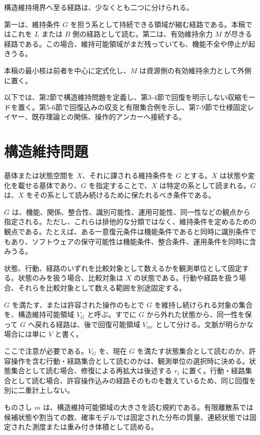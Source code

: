 \documentclass[12pt,a4paper]{article}
\begin{document}
構造維持境界へ至る経路は、少なくとも二つに分けられる。

第一は、維持条件 \(G\) を担う系として持続できる領域が縮む経路である。本稿ではこれを \(L\) または \(B\) 側の経路として読む。第二は、有効維持余力 \(M\) が尽きる経路である。この場合、維持可能領域がまだ残っていても、機能不全や停止が起きうる。

本稿の最小核は前者を中心に定式化し、\(M\) は資源側の有効維持余力として外側に置く。

以下では、第2節で構造維持問題を定義し、第3-4節で回復を明示しない収縮モードを置く。第5-6節で回復込みの収支と有限集合例を示し、第7-9節で仕様固定レイヤー、既存理論との関係、操作的アンカーへ接続する。

\section{構造維持問題}\label{ux69cbux9020ux7dadux6301ux554fux984c}

基体または状態空間を \(X\)、それに課される維持条件を \(G\) とする。\(X\) は状態や変化を載せる基体であり、\(G\) を指定することで、\(X\) は特定の系として読まれる。\(G\) は、\(X\) をその系として読み続けるために保たれるべき条件である。

\(G\) は、機能、関係、整合性、識別可能性、運用可能性、同一性などの観点から指定される。ただし、これらは排他的な分類ではなく、維持条件を定めるための観点である。たとえば、ある一意復元条件は機能条件であると同時に識別条件でもあり、ソフトウェアの保守可能性は機能条件、整合条件、運用条件を同時に含みうる。

状態、行動、経路のいずれを比較対象として数えるかを観測単位として固定する。状態のみを扱う場合、比較対象は \(X\) の状態である。行動や経路を扱う場合、それらを比較対象として数える範囲を別途固定する。

\(G\) を満たす、または許容された操作のもとで \(G\) を維持し続けられる対象の集合を、構造維持可能領域 \(V_{G}\) と呼ぶ。すでに \(G\) から外れた状態から、同一性を保って \(G\) へ戻れる経路は、後で回復可能領域 \(V_{\mathrm{rec}}\) として分ける。文脈が明らかな場合には単に \(V\) と書く。

ここで注意が必要である。\(V_{G}\) を、現在 \(G\) を満たす状態集合として読むのか、許容操作を含む行動・経路集合として読むのかは、観測単位の選択時に決める。状態集合として読む場合、修復による再拡大は後述する \(r_{t}\) に置く。行動・経路集合として読む場合、許容操作込みの経路そのものを数えているため、同じ回復を別に二重計上しない。

ものさし \(m\) は、構造維持可能領域の大きさを読む規約である。有限離散系では候補状態や割当ての数、確率モデルでは固定された分布の質量、連続状態では固定された測度または重み付き体積として読める。
\end{document}
